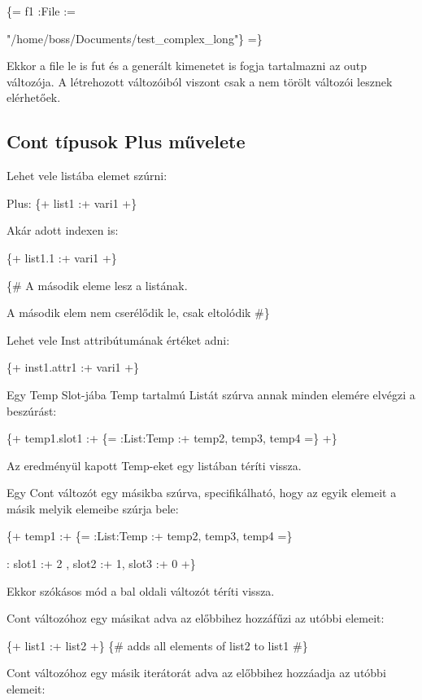 \{= f1 :File := {"/home/boss/Documents/test\_complex\_long"\} =\}

Ekkor a file le is fut és a generált kimenetet is fogja tartalmazni az outp változója.
A létrehozott változóiból viszont csak a nem törölt változói lesznek elérhetőek.



\subsection{Cont típusok Plus művelete}
Lehet vele listába elemet szúrni:

Plus: \{+ list1 :+ vari1 +\}

Akár adott indexen is:

\{+ list1.1 :+ vari1 +\} 

\{\# A második eleme lesz a listának. 

A második elem nem cserélődik le, csak eltolódik \#\}

Lehet vele Inst attribútumának értéket adni:

\{+ inst1.attr1 :+ vari1 +\} 

Egy Temp Slot-jába Temp tartalmú Listát szúrva annak minden elemére elvégzi a beszúrást:

\{+ temp1.slot1 :+ \{= :List:Temp :+ temp2, temp3, temp4 =\} +\} 

Az eredményül kapott Temp-eket egy listában téríti vissza.
 
Egy Cont változót egy másikba szúrva, specifikálható, hogy az egyik elemeit a másik melyik elemeibe szúrja bele:

\{+ temp1 :+ \{= :List:Temp :+ temp2, temp3, temp4 =\}

 : slot1 :+ 2 , slot2 :+ 1, slot3 :+ 0   +\} 

Ekkor szókásos mód a bal oldali változót téríti vissza. 

Cont változóhoz egy másikat adva az előbbihez hozzáfűzi az utóbbi elemeit:

\{+ list1 :+ list2 +\} \{\# adds all elements of list2 to list1 \#\}

Cont változóhoz egy másik iterátorát adva az előbbihez hozzáadja az utóbbi elemeit:

}
